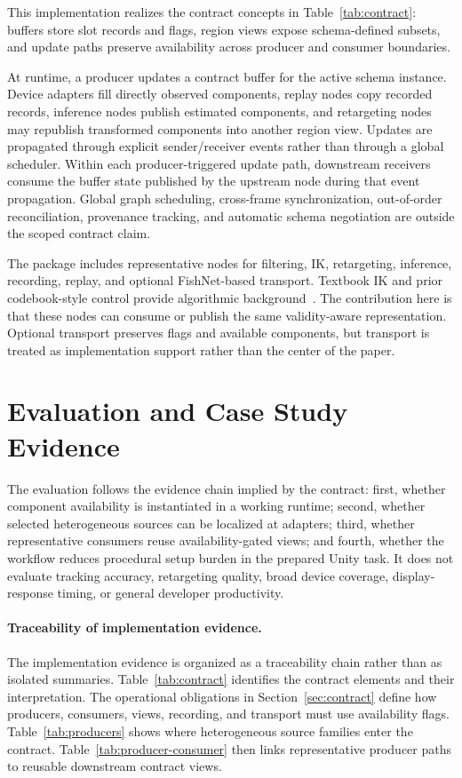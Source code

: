 \documentclass[runningheads]{llncs}
\begin{document}
This implementation realizes the contract concepts in Table~\ref{tab:contract}: buffers store slot records and flags, region views expose schema-defined subsets, and update paths preserve availability across producer and consumer boundaries.

At runtime, a producer updates a contract buffer for the active schema instance. Device adapters fill directly observed components, replay nodes copy recorded records, inference nodes publish estimated components, and retargeting nodes may republish transformed components into another region view. Updates are propagated through explicit sender/receiver events rather than through a global scheduler. Within each producer-triggered update path, downstream receivers consume the buffer state published by the upstream node during that event propagation. Global graph scheduling, cross-frame synchronization, out-of-order reconciliation, provenance tracking, and automatic schema negotiation are outside the scoped contract claim.

The package includes representative nodes for filtering, IK, retargeting, inference, recording, replay, and optional FishNet-based transport. Textbook IK and prior codebook-style control provide algorithmic background~\cite{aristidou2011fabrik,starke2024categorical}. The contribution here is that these nodes can consume or publish the same validity-aware representation. Optional transport preserves flags and available components, but transport is treated as implementation support rather than the center of the paper.

\section{Evaluation and Case Study Evidence}\label{sec:evaluation}
The evaluation follows the evidence chain implied by the contract: first, whether component availability is instantiated in a working runtime; second, whether selected heterogeneous sources can be localized at adapters; third, whether representative consumers reuse availability-gated views; and fourth, whether the workflow reduces procedural setup burden in the prepared Unity task. It does not evaluate tracking accuracy, retargeting quality, broad device coverage, display-response timing, or general developer productivity.

\paragraph{Traceability of implementation evidence.}
The implementation evidence is organized as a traceability chain rather than as isolated summaries. Table~\ref{tab:contract} identifies the contract elements and their interpretation. The operational obligations in Section~\ref{sec:contract} define how producers, consumers, views, recording, and transport must use availability flags. Table~\ref{tab:producers} shows where heterogeneous source families enter the contract. Table~\ref{tab:producer-consumer} then links representative producer paths to reusable downstream contract views.
\end{document}
